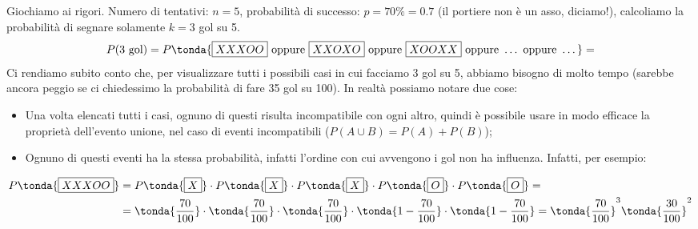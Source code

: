 \begin{esempio} Giochiamo ai rigori. Numero di tentativi: \(n=5\), probabilità di successo: \(p = 70\%=0.7\) (il portiere non è un asso, diciamo!), calcoliamo la probabilità di segnare solamente \(k=3\) gol su 5.
\[P(\text{3 gol})= P\tonda{\text{\boxed{XXXOO}} \text{ oppure } \text{\boxed{XXOXO}} \text{ oppure } \text{\boxed{XOOXX}} \text{ oppure } \dots \text{ oppure } \dots} = \]
Ci rendiamo subito conto che, per visualizzare tutti i possibili casi in cui facciamo 3 gol su 5, abbiamo bisogno di molto tempo (sarebbe ancora peggio se ci chiedessimo la probabilità di fare 35 gol su 100). In realtà possiamo notare due cose: 
\begin{itemize}
\item Una volta elencati tutti i casi, ognuno di questi risulta incompatibile con ogni altro, quindi è possibile usare in modo efficace la proprietà dell'evento unione, nel caso di eventi incompatibili (\(P(A \cup B) = P(A) +P(B)\));
\item Ognuno di questi eventi ha la stessa probabilità, infatti l'ordine con cui avvengono i gol non ha influenza. Infatti, per esempio:
\end{itemize}
\[\begin{split}P\tonda{\text{\boxed{XXXOO}}} &= P\tonda{\text{\boxed{X}}} \cdot P\tonda{\text{\boxed{X}}} \cdot P\tonda{\text{\boxed{X}}} \cdot P\tonda{\text{\boxed{O}}} \cdot P\tonda{\text{\boxed{O}}}=\\ &= \tonda{\dfrac{70}{100}} \cdot  \tonda{\dfrac{70}{100}} \cdot  \tonda{\dfrac{70}{100}} \cdot  \tonda{1-\dfrac{70}{100}} \cdot \tonda{ 1-\dfrac{70}{100}} =\tonda{\dfrac{70}{100}}^3 \tonda{\dfrac{30}{100}}^2 \end{split}\]


\end{esempio}
